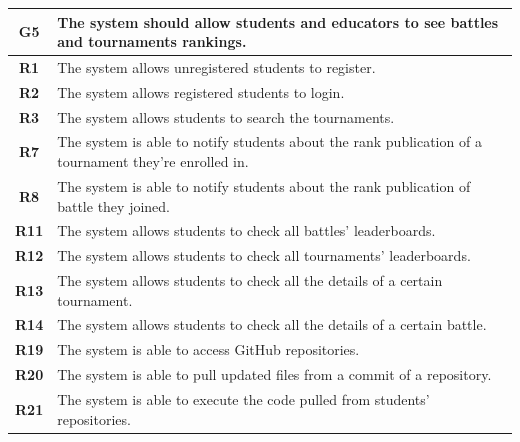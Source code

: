 \documentclass[12pt, a4paper]{report}
\begin{document}
    \begin{table}[H]
        \begin{tabularx}{\textwidth}{cX}
        \textbf{G5}   & The system should allow students and educators to see battles and tournaments rankings.                                         \\ \hline
        \textbf{R1}   & The system allows unregistered students to register.                                                                            \\
        \textbf{R2}   & The system allows registered students to login.                                                                                 \\
        \textbf{R3}   & The system allows students to search the tournaments.                                                                           \\
        \textbf{R7}   & The system is able to notify students about the rank publication of a tournament they're enrolled in.                          \\
        \textbf{R8}   & The system is able to notify students about the rank publication of battle they joined.                                        \\
        \textbf{R11}  & The system allows students to check all battles' leaderboards.                                                                  \\
        \textbf{R12}  & The system allows students to check all tournaments' leaderboards.                                                              \\
        \textbf{R13}  & The system allows students to check all the details of a certain tournament.                                                    \\
        \textbf{R14}  & The system allows students to check all the details of a certain battle.                                                        \\
        \textbf{R19}  & The system is able to access GitHub repositories.                                                                               \\
        \textbf{R20}  & The system is able to pull updated files from a commit of a repository.                                                         \\
        \textbf{R21}  & The system is able to execute the code pulled from students' repositories.                                                      \\

\end{tabularx}
\end{table}
\end{document}
